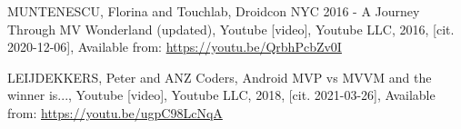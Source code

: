 \begin{thebibliography}{9}

 MUNTENESCU, Florina and Touchlab, Droidcon NYC 2016 - A Journey Through MV Wonderland (updated), Youtube [video], Youtube LLC, 2016, [cit. 2020-12-06], Available from: \url{https://youtu.be/QrbhPcbZv0I}

 LEIJDEKKERS, Peter and ANZ Coders, Android MVP vs MVVM and the winner is..., Youtube [video], Youtube LLC, 2018, [cit. 2021-03-26], Available from: \url{https://youtu.be/ugpC98LcNqA}

\end{thebibliography}